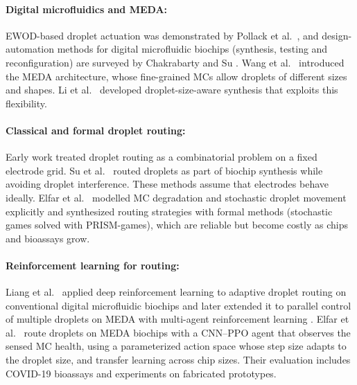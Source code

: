 \documentclass[11pt,a4paper]{article}
\begin{document}
\paragraph{Digital microfluidics and MEDA:}
EWOD-based droplet actuation was demonstrated by Pollack et al.\ \cite{pollack2000},
and design-automation methods for digital microfluidic biochips (synthesis,
testing and reconfiguration) are surveyed by Chakrabarty and Su
\cite{chakrabarty2006}. Wang et al.\ \cite{wang2011} introduced the MEDA
architecture, whose fine-grained MCs allow droplets of different sizes and
shapes. Li et al.\ \cite{li2017} developed droplet-size-aware synthesis that
exploits this flexibility.

\paragraph{Classical and formal droplet routing:}
Early work treated droplet routing as a combinatorial problem on a fixed
electrode grid. Su et al.\ \cite{su2006} routed droplets as part of biochip
synthesis while avoiding droplet interference. These methods assume that
electrodes behave ideally. Elfar et al.\ \cite{elfar2021date,elfar2022tcad}
modelled MC degradation and stochastic droplet movement explicitly and
synthesized routing strategies with formal methods (stochastic games solved
with PRISM-games), which are reliable but become costly as chips and bioassays
grow.

\paragraph{Reinforcement learning for routing:}
Liang et al.\ \cite{liang2020} applied deep reinforcement learning to
adaptive droplet routing on conventional digital microfluidic biochips and
later extended it to parallel control of multiple droplets on MEDA with
multi-agent reinforcement learning \cite{liang2021}. Elfar et al.\
\cite{elfar2022date,elfar2023} route droplets on MEDA biochips with a CNN--PPO
agent that observes the sensed MC health, using a parameterized action space
whose step size adapts to the droplet size, and transfer learning across chip
sizes. Their evaluation includes COVID-19 bioassays and experiments on
fabricated prototypes.
\end{document}
